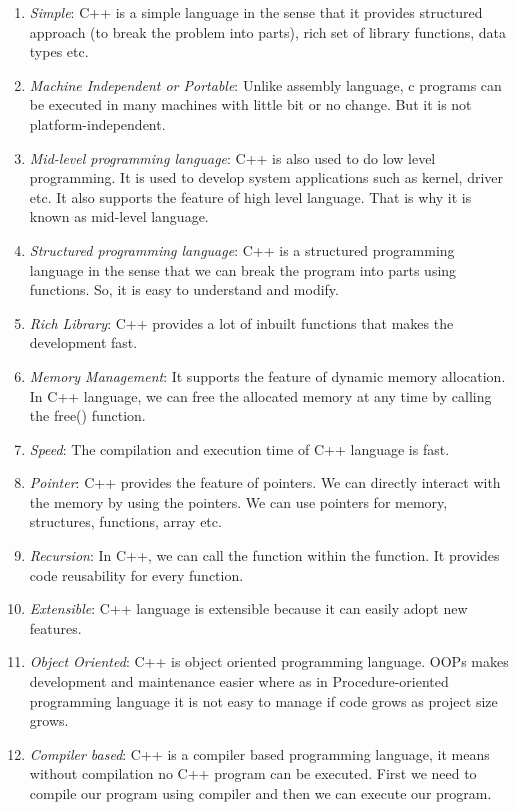 \documentclass{book}
\begin{document}
\begin{enumerate}
	\item \textit{Simple}: C++ is a simple language in the sense that it provides structured approach (to break the problem into parts), rich set of library functions, data types etc.

\item \textit{Machine Independent or Portable}: Unlike assembly language, c programs can be executed in many machines with little bit or no change. But it is not platform-independent.

\item \textit{Mid-level programming language}: C++ is also used to do low level programming. It is used to develop system applications such as kernel, driver etc. It also supports the feature of high level language. That is why it is known as mid-level language.

\item \textit{Structured programming language}: C++ is a structured programming language in the sense that we can break the program into parts using functions. So, it is easy to understand and modify.

\item \textit{Rich Library}: C++ provides a lot of inbuilt functions that makes the development fast.

\item \textit{Memory Management}: It supports the feature of dynamic memory allocation. In C++ language, we can free the allocated memory at any time by calling the free() function.

\item \textit{Speed}: The compilation and execution time of C++ language is fast.

\item \textit{Pointer}: C++ provides the feature of pointers. We can directly interact with the memory by using the pointers. We can use pointers for memory, structures, functions, array etc.

\item \textit{Recursion}: In C++, we can call the function within the function. It provides code reusability for every function.

\item \textit{Extensible}: C++ language is extensible because it can easily adopt new features.

\item \textit{Object Oriented}: C++ is object oriented programming language. OOPs makes development and maintenance easier where as in Procedure-oriented programming language it is not easy to manage if code grows as project size grows.

\item \textit{Compiler based}: C++ is a compiler based programming language, it means without compilation no C++ program can be executed. First we need to compile our program using compiler and then we can execute our program.
\end{enumerate}
\end{document}
